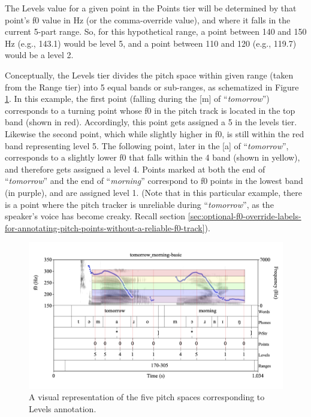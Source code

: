 \documentclass[11pt, twoside]{memoir}
\def\langtext#1{\textit{#1}}
\begin{document}
The Levels value for a given point in the Points tier will be determined by that point’s f0 value in Hz (or the comma-override value), and where it falls in the current 5-part range. So, for this hypothetical range, a point between 140 and 150 Hz (e.g., 143.1) would be level 5, and a point between 110 and 120 (e.g., 119.7) would be a level 2.

Conceptually, the Levels tier divides the pitch space within given range (taken from the Range tier) into 5 equal bands or sub-ranges, as schematized in Figure \ref{fig:tomorrow_morning Levels basic}. In this example, the first point (falling during the [m] of “\langtext{tomorrow}”) corresponds to a turning point whose f0 in the pitch track is located in the top band (shown in red). Accordingly, this point gets assigned a 5 in the levels tier. Likewise the second point, which while slightly higher in f0, is still within the red band representing level 5. The following point, later in the [a] of “\langtext{tomorrow}”, corresponds to a slightly lower f0 that falls within the 4 band (shown in yellow), and therefore gets assigned a level 4. Points marked at both the end of “\langtext{tomorrow}” and the end of “\langtext{morning}” correspond to f0 points in the lowest band (in purple), and are assigned level 1. (Note that in this particular example, there is a point where the pitch tracker is unreliable during “\langtext{tomorrow}”, as the speaker’s voice has become creaky. Recall section \ref{sec:optional-f0-override-labels-for-annotating-pitch-points-without-a-reliable-f0-track}).

\begin{figure}[H]
\centering
%
\includegraphics[width=.875\linewidth]{Levels-tomorrow_morning-basic.png}
%
\caption{A visual representation of the five pitch spaces corresponding to Levels annotation.%
\label{fig:tomorrow_morning Levels basic}%
%
}
\end{figure}
\end{document}
